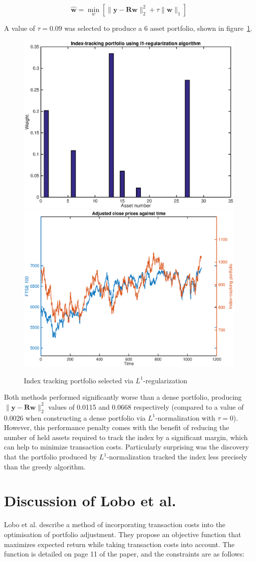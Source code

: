 \documentclass[a4paper, 12pt]{article}
\begin{document}
	\[\mathbf{\hat{w}} = \min_{w} [\|\mathbf{y} - \mathbf{Rw}\|_2^2 + \tau \| \mathbf{w} \|_1]\]

	A value of $\tau = 0.09$ was selected to produce a 6 asset portfolio, shown in figure~\ref{fig:p3b}.

	\begin{figure}
		\begin{center}
			\includegraphics[width=0.45\linewidth]{figures/p3b_portfolio.eps}
			\includegraphics[width=0.45\linewidth]{figures/p3b_ticker.eps}
		\end{center}
		\caption{Index tracking portfolio selected via $L^1$-regularization}
		\label{fig:p3b}
	\end{figure}

	Both methods performed significantly worse than a dense portfolio, producing $\|\mathbf{y} - \mathbf{Rw}\|_2^2$ values of 0.0115 and 0.0668 respectively (compared to a value of 0.0026 when constructing a dense portfolio via $L^1$-normalization with $\tau = 0$). However, this performance penalty comes with the benefit of reducing the number of held assets required to track the index by a significant margin, which can help to minimize transaction costs. Particularly surprising was the discovery that the portfolio produced by $L^1$-normalization tracked the index less precisely than the greedy algorithm.

	\section{Discussion of Lobo et al.}

	Lobo et al. describe a method of incorporating transaction costs into the optimisation of portfolio adjustment. They propose an objective function that maximizes expected return while taking transaction costs into account. The function is detailed on page 11 of the paper, and the constraints are as follows:
\end{document}
